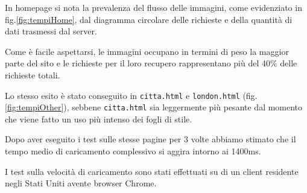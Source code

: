 In homepage si nota la prevalenza del flusso delle immagini, come evidenziato
in fig.\ref{fig:tempiHome}, dal diagramma circolare delle richieste e della
quantità di dati trasmessi dal server.

Come è facile aspettarsi, le immagini occupano in termini di peso la maggior
parte del sito e le richieste per il loro recupero rappresentano più del 40\%
delle richieste totali.


Lo stesso esito è stato conseguito in \texttt{citta.html} e
\texttt{london.html} (fig.\ref{fig:tempiOther}), sebbene \texttt{citta.html}
sia leggermente più pesante dal momento che viene fatto un uso più intenso dei
fogli di stile.

Dopo aver eseguito i test sulle stesse pagine per 3 volte abbiamo stimato che il tempo medio di caricamento complessivo si aggira intorno ai 1400ms.

I test sulla velocità di caricamento sono stati effettuati su di un client residente negli Stati Uniti avente browser Chrome.


